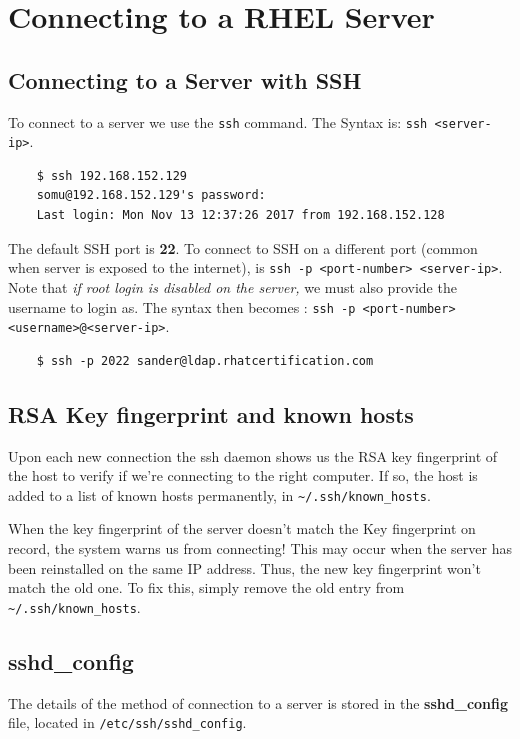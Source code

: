 \documentclass{report}
\begin{document}
	\chapter{Connecting to a RHEL Server}
	\section{Connecting to a Server with SSH}
	To connect to a server we use the \verb|ssh| command. The Syntax is: \verb|ssh <server-ip>|.
	
	\begin{verbatim}
	$ ssh 192.168.152.129
	somu@192.168.152.129's password: 
	Last login: Mon Nov 13 12:37:26 2017 from 192.168.152.128
	\end{verbatim}
	
	The default SSH port is \textbf{22}. To connect to SSH on a different port (common when server is exposed to the internet), is \verb|ssh -p <port-number> <server-ip>|. Note that \textit{if root login is disabled on the server,} we must also provide the username to login as. The syntax then becomes : \verb|ssh -p <port-number> <username>@<server-ip>|.
	
	\begin{verbatim} 
	$ ssh -p 2022 sander@ldap.rhatcertification.com
	\end{verbatim}
	
	\section{RSA Key fingerprint and known hosts}
	Upon each new connection the ssh daemon shows us the RSA key fingerprint of the host to verify if we're connecting to the right computer. If so, the host is added to a list of known hosts permanently, in \verb|~/.ssh/known_hosts|. 
	
	When the key fingerprint of the server doesn't match the Key fingerprint on record, the system warns us from connecting! This may occur when the server has been reinstalled on the same IP address. Thus, the new key fingerprint won't match the old one. To fix this, simply remove the old entry from \verb|~/.ssh/known_hosts|.
	
	\section{sshd\_config}
	The details of the method of connection to a server is stored in the \textbf{sshd\_config} file, located in \verb|/etc/ssh/sshd_config|. 
	
\end{document}

